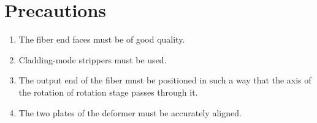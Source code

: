 \documentclass[%
 reprint,
nofootinbib,
 amsmath,amssymb,
 aps,
]{revtex4-2}
\begin{document}
\section{Precautions}
\begin{enumerate}
	\item The fiber end faces must be of good quality.
	\item Cladding-mode strippers must be used.
	\item The output end of the fiber must be positioned in such a way that the axis
	of the rotation of rotation stage passes through it.
	\item The two plates of the deformer must be accurately aligned.
\end{enumerate}

	

	
	


\appendix


\end{document}
